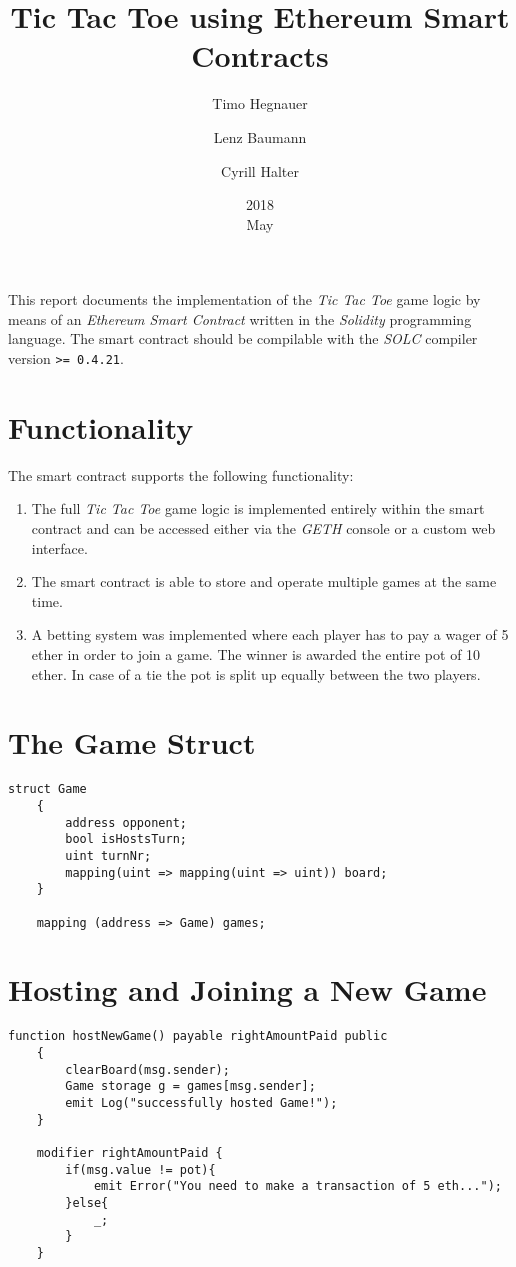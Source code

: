 \documentclass[11pt]{article}
\title{Tic Tac Toe using Ethereum Smart Contracts}
\date{2018\\ May}
\author{Timo Hegnauer
\and Lenz Baumann
\and Cyrill Halter}
\begin{document}
\maketitle
This report documents the implementation of the \emph{Tic Tac Toe} game logic by means of an \emph{Ethereum Smart Contract} written in the \emph{Solidity} programming language. The smart contract should be compilable with the \emph{SOLC} compiler version \texttt{>= 0.4.21}.

\section{Functionality}
The smart contract supports the following functionality:
\begin{enumerate}
	\item The full \emph{Tic Tac Toe} game logic is implemented entirely within the smart contract and can be accessed either via the \emph{GETH} console or a custom web interface.
	\item The smart contract is able to store and operate multiple games at the same time.
	\item A betting system was implemented where each player has to pay a wager of 5 ether in order to join a game. The winner is awarded the entire pot of 10 ether. In case of a tie the pot is split up equally between the two players.
\end{enumerate}

\section{The Game Struct}
\begin{Verbatim}[fontsize=\small]
    struct Game
    {
        address opponent;
        bool isHostsTurn;
        uint turnNr;
        mapping(uint => mapping(uint => uint)) board;
    }

    mapping (address => Game) games;
\end{Verbatim}

\section{Hosting and Joining a New Game}
\begin{Verbatim}[fontsize=\small]
    function hostNewGame() payable rightAmountPaid public
    {
        clearBoard(msg.sender);
        Game storage g = games[msg.sender];
        emit Log("successfully hosted Game!");
    }
    
    modifier rightAmountPaid {
        if(msg.value != pot){
            emit Error("You need to make a transaction of 5 eth...");
        }else{
            _;
        }
    }
\end{Verbatim}
\end{document}
